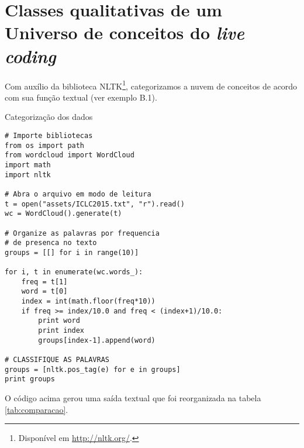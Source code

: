 \chapter{Classes qualitativas de um Universo de conceitos do \emph{live coding}}\label{app:A}

Com auxílio da biblioteca NLTK\footnote{Disponível em \url{http://nltk.org/}.}, categorizamos a nuvem de conceitos de acordo com sua função textual (ver exemplo B.1). 

\begin{example}{Categorização dos dados}
\begin{verbatim}
# Importe bibliotecas
from os import path
from wordcloud import WordCloud
import math
import nltk

# Abra o arquivo em modo de leitura
t = open("assets/ICLC2015.txt", "r").read()
wc = WordCloud().generate(t)

# Organize as palavras por frequencia
# de presenca no texto
groups = [[] for i in range(10)]

for i, t in enumerate(wc.words_):
    freq = t[1]
    word = t[0]
    index = int(math.floor(freq*10))
    if freq >= index/10.0 and freq < (index+1)/10.0:
        print word
        print index
        groups[index-1].append(word)

# CLASSIFIQUE AS PALAVRAS
groups = [nltk.pos_tag(e) for e in groups]
print groups
\end{verbatim}
\label{cod:classes}
\end{example}

O código acima gerou uma saída textual que foi reorganizada na tabela \autoref{tab:comparacao}.

